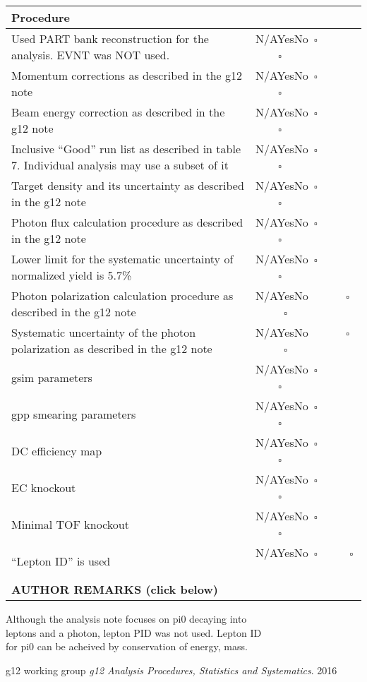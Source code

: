 \documentclass[11pt]{article} %
\newcommand{\YesNoYes}{\textsf{N/A}\hskip11pt\textsf{Yes}\hskip11pt\textsf{No}\hskip11pt{\Large ~$\square$}~~~~ {\Large ~\makebox[0pt][l]{$\square$}\raisebox{.15ex}{\hspace{0.1em}$\checkmark$} }~~~~{\Large $\square$}}
\newcommand{\YesNoNo}{\textsf{N/A}\hskip11pt\textsf{Yes}\hskip11pt\textsf{No}\hskip11pt{\Large ~$\square$}~~~~ {\Large ~$\square$}~~~~{\Large ~\makebox[0pt][l]{$\square$}\raisebox{.15ex}{\hspace{0.1em}$\checkmark$}}}
\newcommand{\YesNoNa}{\textsf{N/A}\hskip11pt\textsf{Yes}\hskip11pt\textsf{No}\hskip11pt{\Large ~\makebox[0pt][l]{$\square$}\raisebox{.15ex}{\hspace{0.1em}$\checkmark$}}~~~~ {\Large ~$\square$}~~~~{\Large ~$\square$}}
\newcommand{\heading}[1]{%
	\multicolumn{2}{l|}{\bf\textsf{#1}}\\ \hline %
}
\begin{document}
	\begin{longtable}{|p{6.61cm}|p{3.1cm}|}
		\heading{Procedure}
		\textsf{Used PART bank reconstruction for the analysis. EVNT was NOT used.} & \YesNoYes \\ \hline
        \textsf{Momentum corrections as described in the g12 note} & \YesNoYes \\ \hline
		\textsf{Beam energy correction as described in the g12 note}& \YesNoYes \\ \hline
		\textsf{Inclusive “Good” run list as described in table 7. Individual analysis may use a subset of it}& \YesNoYes \\ \hline
		\textsf{Target density and its uncertainty as described in the g12 note}& \YesNoYes \\ \hline
		\textsf{Photon flux calculation procedure as described in the g12 note}& \YesNoYes \\ \hline
		\textsf{Lower limit for the systematic uncertainty of normalized yield is 5.7\%}& \YesNoYes \\ \hline
		\textsf{Photon polarization calculation procedure as described in the g12 note}& \YesNoNa \\ \hline
		\textsf{Systematic uncertainty of the photon polarization as described in the g12 note}& \YesNoNa \\ \hline
		\textsf{gsim parameters}& \YesNoYes \\ \hline
		\textsf{gpp smearing parameters}& \YesNoYes \\ \hline
		\textsf{DC efficiency map}& \YesNoYes \\ \hline
		\textsf{EC knockout}& \YesNoYes \\ \hline
		\textsf{Minimal TOF knockout}& \YesNoYes \\ \hline
		\textsf{“Lepton ID” is used}& \YesNoNo \\ \hline
		\hline%
		\multicolumn{2}{|l|}{\bf {\textsf{AUTHOR REMARKS}} (click below)}\\
	\end{longtable}
	\vspace{-0.75cm}
	\begin{Form}
		\begin{center}
		\centering
			\quad  Although the analysis note focuses on pi0 decaying into \\
			\quad  leptons and a photon, lepton PID was not used. Lepton ID \\
			\quad \quad for pi0 can be acheived by conservation of energy, mass.
		\end{center}
	\end{Form}
		\vspace{0.75cm}
	
	\begin{thebibliography}{9}
		g12 working group
		\textit{g12 Analysis Procedures, Statistics and Systematics}.
		2016
	\end{thebibliography}
	
	
\end{document}
